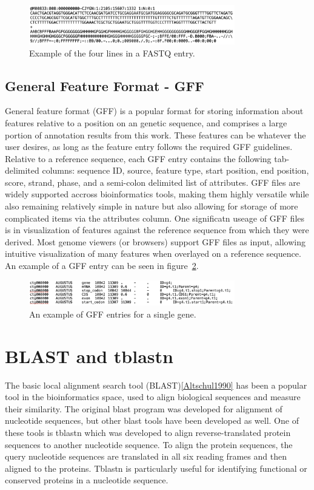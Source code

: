 \begin{figure}
  \centering
  \includegraphics[width=0.8\textwidth]{figures/fastq-example.png}
  \caption{Example of the four lines in a FASTQ entry.}
  \label{fig:fastq-example}
\end{figure}

\subsection{General Feature Format - GFF}
General feature format (GFF) is a popular format for storing
information about features relative to a position on an genetic
sequence, and comprises a large portion of annotation results from
this work. These features can be whatever the user desires, as long as
the feature entry follows the required GFF guidelines. Relative to a
reference sequence, each GFF entry contains the following
tab-delimited columns: sequence ID, source, feature type, start
position, end position, score, strand, phase, and a semi-colon
delimited list of attributes. GFF files are widely supported accross
bioinformatics tools, making them highly versatile while also
remaining relatively simple in nature but also allowing for storage of
more complicated items via the attributes column. One significatn
useage of GFF files is in visualization of features against the
reference sequence from which they were derived. Most genome viewers
(or browsers) support GFF files as input, allowing intuitive
visualization of many features when overlayed on a reference
sequence. An example of a GFF entry can be seen in
figure~\ref{fig:gff-example}.

\begin{figure}
  \centering
  \includegraphics[width=0.8\textwidth]{figures/gff-example.png}
  \caption{An example of GFF entries for a single gene.}
  \label{fig:gff-example}
\end{figure}

\section{BLAST and tblastn}
The basic local	alignment search tool (BLAST)\ref{Altschul1990}	has
been a popular tool in the bioinformatics space, used to align
biological sequences and measure their similarity. The original	blast
program was developed for alignment of nucleotide sequences, but other
blast tools have been developed as well. One of these tools is tblastn
which was developed to align reverse-translated protein sequences to
another nucleotide sequence. To align the protein sequences, the query
nucleotide sequences are translated in all six reading frames and then
aligned to the proteins.  Tblastn is particularly useful for
identifying functional or conserved proteins in	a nucleotide sequence.

